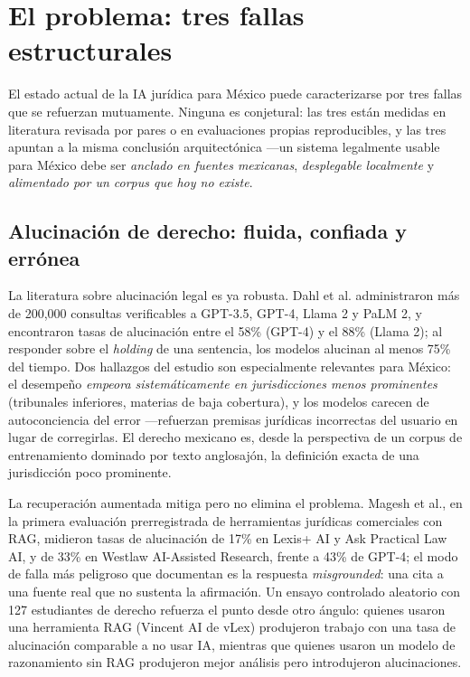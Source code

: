 \section{El problema: tres fallas estructurales}\label{sec:problema}

El estado actual de la IA jurídica para México puede caracterizarse por tres fallas que se refuerzan mutuamente. Ninguna es conjetural: las tres están medidas en literatura revisada por pares o en evaluaciones propias reproducibles, y las tres apuntan a la misma conclusión arquitectónica ---un sistema legalmente usable para México debe ser \emph{anclado en fuentes mexicanas}, \emph{desplegable localmente} y \emph{alimentado por un corpus que hoy no existe}.

\subsection{Alucinación de derecho: fluida, confiada y errónea}

La literatura sobre alucinación legal es ya robusta. Dahl et al. administraron más de 200,000 consultas verificables a GPT-3.5, GPT-4, Llama 2 y PaLM 2, y encontraron tasas de alucinación entre el 58\% (GPT-4) y el 88\% (Llama 2); al responder sobre el \emph{holding} de una sentencia, los modelos alucinan al menos 75\% del tiempo.\cite{dahl2024} Dos hallazgos del estudio son especialmente relevantes para México: el desempeño \emph{empeora sistemáticamente en jurisdicciones menos prominentes} (tribunales inferiores, materias de baja cobertura), y los modelos carecen de autoconciencia del error ---refuerzan premisas jurídicas incorrectas del usuario en lugar de corregirlas.\cite{dahl2024} El derecho mexicano es, desde la perspectiva de un corpus de entrenamiento dominado por texto anglosajón, la definición exacta de una jurisdicción poco prominente.

La recuperación aumentada mitiga pero no elimina el problema. Magesh et al., en la primera evaluación prerregistrada de herramientas jurídicas comerciales con RAG, midieron tasas de alucinación de 17\% en Lexis+ AI y Ask Practical Law AI, y de 33\% en Westlaw AI-Assisted Research, frente a 43\% de GPT-4; el modo de falla más peligroso que documentan es la respuesta \emph{misgrounded}: una cita a una fuente real que no sustenta la afirmación.\cite{magesh2025,stanfordhai2024} Un ensayo controlado aleatorio con 127 estudiantes de derecho refuerza el punto desde otro ángulo: quienes usaron una herramienta RAG (Vincent AI de vLex) produjeron trabajo con una tasa de alucinación comparable a no usar IA, mientras que quienes usaron un modelo de razonamiento sin RAG produjeron mejor análisis pero introdujeron alucinaciones.\cite{ailawlibrarians2026}

